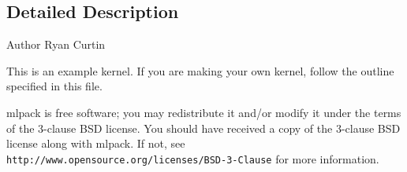 \subsection{Detailed Description}
\begin{DoxyAuthor}{Author}
Ryan Curtin
\end{DoxyAuthor}
This is an example kernel. If you are making your own kernel, follow the outline specified in this file.

mlpack is free software; you may redistribute it and/or modify it under the terms of the 3-\/clause B\+SD license. You should have received a copy of the 3-\/clause B\+SD license along with mlpack. If not, see {\tt http\+://www.\+opensource.\+org/licenses/\+B\+S\+D-\/3-\/\+Clause} for more information. 